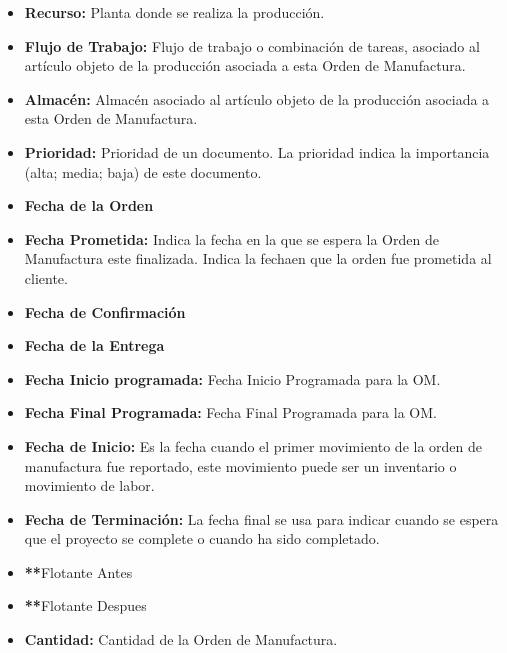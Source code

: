 \documentclass[letterpaper,10pt,spanish]{sphinxmanual}
\begin{document}
\begin{enumerate}
\begin{description}
\begin{itemize}
\item {} 
\textbf{Recurso:} Planta donde se realiza la producción.

\item {} 
\textbf{Flujo de Trabajo:} Flujo de trabajo o combinación de tareas, asociado al artículo objeto de la producción asociada a esta Orden de Manufactura.

\item {} 
\textbf{Almacén:} Almacén asociado al artículo objeto de la producción asociada a esta Orden de Manufactura.

\item {} 
\textbf{Prioridad:} Prioridad de un documento. La prioridad indica la importancia (alta; media; baja) de este documento.

\item {} 
\textbf{Fecha de la Orden}

\item {} 
\textbf{Fecha Prometida:} Indica la fecha en la que se espera la Orden de Manufactura este finalizada. Indica la fechaen que la orden fue prometida al cliente.

\item {} 
\textbf{Fecha de Confirmación}

\item {} 
\textbf{Fecha de la Entrega}

\item {} 
\textbf{Fecha Inicio programada:} Fecha Inicio Programada para la OM.

\item {} 
\textbf{Fecha Final Programada:} Fecha Final Programada para la OM.

\item {} 
\textbf{Fecha de Inicio:} Es la fecha cuando el primer movimiento de la orden de manufactura fue reportado, este movimiento puede ser un inventario o movimiento de labor.

\item {} 
\textbf{Fecha de Terminación:} La fecha final se usa para indicar cuando se espera que el proyecto se complete o cuando ha sido completado.

\item {} 
{\color{red}\bfseries{}**}Flotante Antes

\item {} 
{\color{red}\bfseries{}**}Flotante Despues

\item {} 
\textbf{Cantidad:} Cantidad de la Orden de Manufactura.


\end{itemize}
\end{description}
\end{enumerate}
\end{document}
